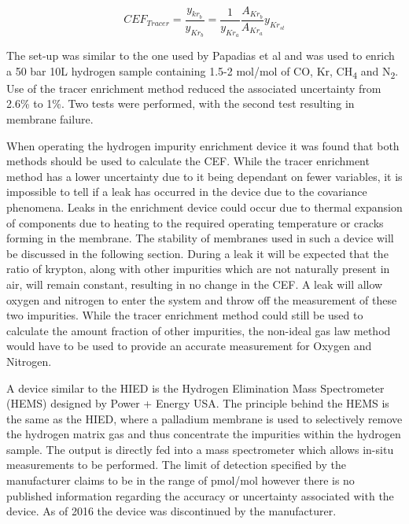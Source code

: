 \begin{equation} \label{eq:3}
    CEF_{Tracer} = \frac{y_{kr_b}}{y_{Kr_b}} = \frac{1}{y_{Kr_a}} \frac{A_{Kr_b}}{A_{Kr_a}} y_{Kr_{st}}
\end{equation}

The set-up was similar to the one used by Papadias et al \cite{Ahmed2010} and was used to enrich a 50 bar 10L hydrogen sample 
containing 1.5-2 \textmu mol/mol of CO, Kr, CH\textsubscript{4} and N\textsubscript{2}. Use of the tracer enrichment 
method reduced the associated uncertainty from 2.6\% to 1\%. 
Two tests were performed, with the second test resulting in membrane failure. 

When operating the hydrogen impurity enrichment device it was found that both methods should be used to 
calculate the CEF.\cite{Murugan2014}\cite{Murugan2015} While the tracer enrichment method has a lower uncertainty 
due to it being dependant on fewer variables, it is impossible to tell if a leak has occurred in the device 
due to the covariance 
phenomena. \cite{Murugan2014} Leaks in the enrichment device could occur due to thermal expansion of components due to heating 
to the required operating temperature or cracks forming in the membrane. The stability of membranes used in 
such a device will be discussed in the following section. During a leak it will be expected that the ratio of 
krypton, along with other impurities which are not naturally present in air, will remain constant, resulting 
in no change in the CEF. A leak will allow oxygen and nitrogen to enter the system and throw off the 
measurement of these two impurities. While the tracer enrichment method could still be used to calculate 
the amount fraction of other impurities, the non-ideal gas law method would have to be used to provide an 
accurate measurement for Oxygen and Nitrogen.

A device similar to the HIED is the Hydrogen Elimination Mass Spectrometer (HEMS) designed by Power + Energy USA. \cite{Bossard} 
The principle behind the HEMS is the same as the HIED, where a palladium membrane is used to selectively 
remove the hydrogen matrix gas and thus concentrate the impurities within the hydrogen sample. 
The output is directly fed into a mass spectrometer which allows in-situ measurements to be performed. 
The limit of detection specified by the manufacturer claims to be in the range of pmol/mol however there is 
no published information regarding the accuracy or uncertainty associated with the device. 
As of 2016 the device was discontinued by the manufacturer.

